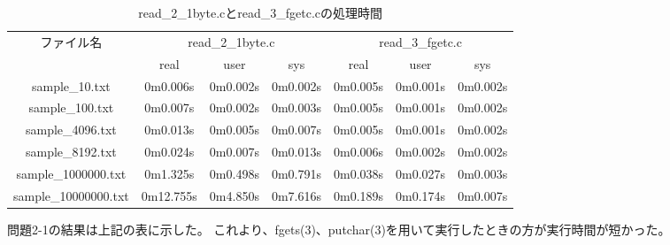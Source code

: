 \documentclass[12pt]{jarticle}
\begin{document}
\begin{table}[t]
    \caption{read\_2\_1byte.cとread\_3\_fgetc.cの処理時間}
    \begin{center}
        \begin{tabular}{|c||c|c|c|c|c|c|}
            \hline
            \multirow{2}{*}{ファイル名} & \multicolumn{3}{|c|}{read\_2\_1byte.c} & \multicolumn{3}{|c|}{read\_3\_fgetc.c}                                             \\
            \cline{2-7}
                                        & real                                   & user                                   & sys      & real     & user     & sys      \\
            \hhline{|=#===|===|}
            sample\_10.txt              & 0m0.006s                               & 0m0.002s                               & 0m0.002s & 0m0.005s & 0m0.001s & 0m0.002s \\
            \hline
            sample\_100.txt             & 0m0.007s                               & 0m0.002s                               & 0m0.003s & 0m0.005s & 0m0.001s & 0m0.002s \\
            \hline
            sample\_4096.txt            & 0m0.013s                               & 0m0.005s                               & 0m0.007s & 0m0.005s & 0m0.001s & 0m0.002s \\
            \hline
            sample\_8192.txt            & 0m0.024s                               & 0m0.007s                               & 0m0.013s & 0m0.006s & 0m0.002s & 0m0.002s \\
            \hline
            sample\_1000000.txt         & 0m1.325s                               & 0m0.498s                               & 0m0.791s & 0m0.038s & 0m0.027s & 0m0.003s \\
            \hline
            sample\_10000000.txt        & 0m12.755s                              & 0m4.850s                               & 0m7.616s & 0m0.189s & 0m0.174s & 0m0.007s \\
            \hline
        \end{tabular}
    \end{center}
    \label{tbl1}
\end{table}

問題2-1の結果は上記の表に示した。
これより、fgets(3)、putchar(3)を用いて実行したときの方が実行時間が短かった。
\end{document}
